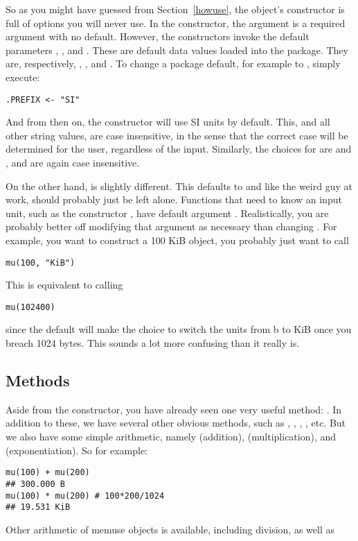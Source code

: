 So as you might have guessed from Section~\ref{howuse}, the  object's constructor is full of options you will never use.  In the constructor, the argument  is a required argument with no default.  However, the constructors invoke the default parameters , , and .  These are default data values loaded into the package. They are, respectively, , , and .  To change a package default, for example  to , simply execute:
\begin{lstlisting}[language=rr]
.PREFIX <- "SI"
\end{lstlisting}
And from then on, the constructor will use SI units by default.  This, and all other string values, are case insensitive, in the sense that the correct case will be determined for the user, regardless of the input.  Similarly, the choices for  are  and , and are again case insensitive.

On the other hand,  is slightly different.  This defaults to  and like the weird guy at work, should probably just be left alone.  Functions that need to know an input unit, such as the constructor , have default argument .  Realistically, you are probably better off modifying that argument as necessary than changing .  For example, you want to construct a 100 KiB  object, you probably just want to call
\begin{lstlisting}[language=rr]
mu(100, "KiB")
\end{lstlisting}
This is equivalent to calling
\begin{lstlisting}[language=rr]
mu(102400)
\end{lstlisting}
since the default  will make the choice to switch the units from b to KiB once you breach 1024 bytes.  This sounds a lot more confusing than it really is.



\subsection{Methods}
Aside from the constructor, you have already seen one very useful method:  .  In addition to these, we have several other obvious methods, such as , , , , etc.  But we also have some simple arithmetic, namely  (addition),  (multiplication), and  (exponentiation).  So for example:
\begin{lstlisting}[language=rr]
mu(100) + mu(200)
## 300.000 B
mu(100) * mu(200) # 100*200/1024
## 19.531 KiB
\end{lstlisting}
Other arithmetic of memuse objects is available, including division, as well as 

